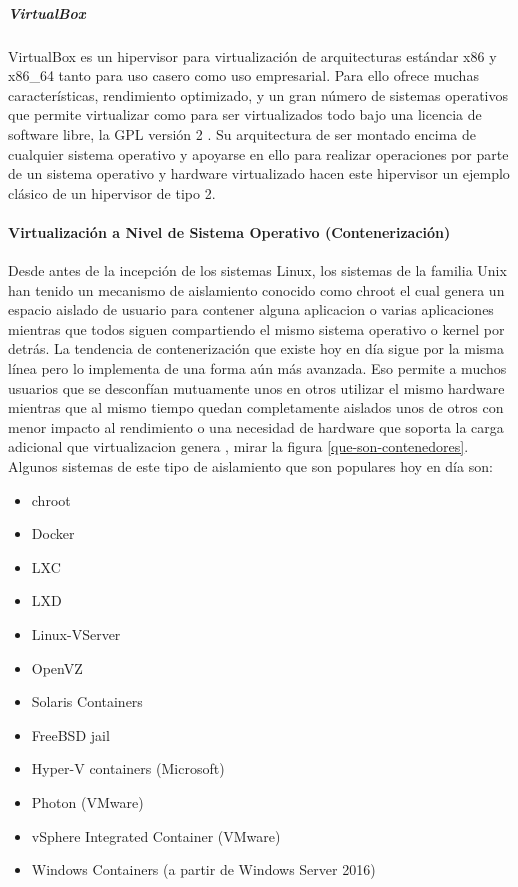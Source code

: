  
\subparagraph{VirtualBox}
VirtualBox es un hipervisor para virtualización de arquitecturas estándar x86 y x86\_64 tanto para uso casero como uso empresarial. Para ello ofrece muchas características, rendimiento optimizado, y un gran número de sistemas operativos que permite virtualizar como para ser virtualizados todo bajo una licencia de software libre, la GPL versión 2 \citep{VirtualBox}. Su arquitectura de ser montado encima de cualquier sistema operativo y apoyarse en ello para realizar operaciones por parte de un sistema operativo y hardware virtualizado hacen este hipervisor un ejemplo clásico de un hipervisor de tipo 2.
 

\paragraph{Virtualización a Nivel de Sistema Operativo (Contenerización)}
Desde antes de la incepción de los sistemas Linux, los sistemas de la familia Unix han tenido un mecanismo de aislamiento conocido como chroot el cual genera un espacio aislado de usuario para contener alguna aplicacion o varias aplicaciones mientras que todos siguen compartiendo el mismo sistema operativo o kernel por detrás. La tendencia de contenerización que existe hoy en día sigue por la misma línea pero lo implementa de una forma aún más avanzada. Eso permite a muchos usuarios que se desconfían mutuamente unos en otros utilizar el mismo hardware mientras que al mismo tiempo quedan completamente aislados unos de otros con menor impacto al rendimiento o una necesidad de hardware que soporta la carga adicional que virtualizacion genera \citep{Teimouri-Davoud-OS-level-virt}, mirar la figura \ref{que-son-contenedores}. Algunos sistemas de este tipo de aislamiento que son populares hoy en día son:
\begin{multicols}{3}
  \begin{itemize}
      \item chroot
      \item Docker
      \item LXC
      \item LXD
      \item Linux-VServer
      \item OpenVZ
      \item Solaris Containers
      \item FreeBSD jail
      \item Hyper-V containers (Microsoft)
      \item Photon (VMware)
  \end{itemize}
\end{multicols}
\begin{multicols}{2}
	\begin{itemize}
	    \item vSphere Integrated Container (VMware)
	    \item Windows Containers (a partir de Windows Server 2016)
	\end{itemize}
\end{multicols}
 

